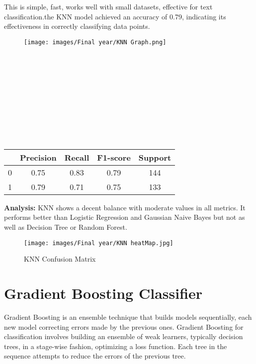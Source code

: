 \documentclass{report}
\begin{document}
{This is simple, fast, works well with small datasets, effective for text classification.the KNN model achieved an accuracy of 0.79, indicating its effectiveness in correctly classifying data points.
    \begin{figure}[h!]
    \centering
        \texttt{[image: images/Final year/KNN Graph.png]} %
    \end{figure} \\ \\ \\ \\ \\ \\ \\ \\ \\  
\begin{center}
\begin{tabular}{|c|c|c|c|c|}
  \hline
   & Precision & Recall & F1-score & Support \\
  \hline
  0 & 0.75 & 0.83 & 0.79 & 144 \\
  1 & 0.79 & 0.71 & 0.75 & 133 \\
  \hline
\end{tabular}
\end{center}
\textbf{Analysis: } KNN shows a decent balance with moderate values in all metrics. It performs better than Logistic Regression and Gaussian Naive Bayes but not as well as Decision Tree or Random Forest.
\vspace{1cm}
    \begin{figure}[h!]
    \centering
        \texttt{[image: images/Final year/KNN heatMap.jpg]} %
        \caption{KNN Confusion Matrix}
    \end{figure} \newpage
\section{Gradient Boosting Classifier}
Gradient Boosting is an ensemble technique that builds models sequentially, each new model correcting errors made by the previous ones. Gradient Boosting for classification involves building an ensemble of weak learners, typically decision trees, in a stage-wise fashion, optimizing a loss function. Each tree in the sequence attempts to reduce the errors of the previous tree.

}
\end{document}
